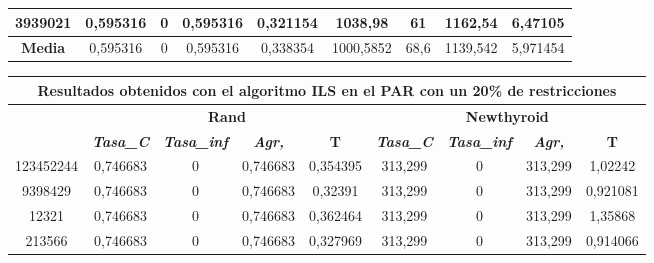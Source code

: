 \documentclass[12pt, spanish]{article}
\begin{document}
\begin{table}[H]
\begin{tabular}{|c|c|c|c|c|c|c|c|c|}
3939021           & 0,595316                  & 0                           & 0,595316               & 0,321154   & 1038,98                   & 61                          & 1162,54                & 6,47105    \\ \hline
\textbf{Media}    & 0,595316                  & 0                           & 0,595316               & 0,338354   & 1000,5852                 & 68,6                        & 1139,542               & 5,971454   \\ \hline
\end{tabular}
\end{table}


\begin{table}[H]
\begin{tabular}{|c|c|c|c|c|c|c|c|c|}
\hline
\multicolumn{9}{|c|}{\textbf{Resultados obtenidos con el algoritmo ILS en el PAR con un 20\% de restricciones}}                                                                                                   \\ \hline
\multirow{2}{*}{} & \multicolumn{4}{c|}{\textbf{Rand}}                                                            & \multicolumn{4}{c|}{\textbf{Newthyroid}}                                                      \\ \cline{2-9} 
                  & \textit{\textbf{Tasa\_C}} & \textit{\textbf{Tasa\_inf}} & \textit{\textbf{Agr,}} & \textbf{T} & \textit{\textbf{Tasa\_C}} & \textit{\textbf{Tasa\_inf}} & \textit{\textbf{Agr,}} & \textbf{T} \\ \hline
123452244         & 0,746683                  & 0                           & 0,746683               & 0,354395   & 313,299                   & 0                           & 313,299                & 1,02242    \\ \hline
9398429           & 0,746683                  & 0                           & 0,746683               & 0,32391    & 313,299                   & 0                           & 313,299                & 0,921081   \\ \hline
12321             & 0,746683                  & 0                           & 0,746683               & 0,362464   & 313,299                   & 0                           & 313,299                & 1,35868    \\ \hline
213566            & 0,746683                  & 0                           & 0,746683               & 0,327969   & 313,299                   & 0                           & 313,299                & 0,914066   \\ \hline

\end{tabular}
\end{table}
\end{document}
